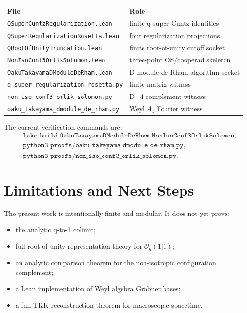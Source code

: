 \documentclass[11pt]{article}
\newcommand{\On}{\mathcal{O}}
\begin{document}
\begin{center}
\begin{tabular}{ll}
\toprule
File & Role\\
\midrule
\texttt{QSuperCuntzRegularization.lean} & finite q-super-Cuntz identities\\
\texttt{QSuperRegularizationRosetta.lean} & four regularization projections\\
\texttt{QRootOfUnityTruncation.lean} & finite root-of-unity cutoff socket\\
\texttt{NonIsoConf3OrlikSolomon.lean} & three-point OS/cooperad skeleton\\
\texttt{OakuTakayamaDModuleDeRham.lean} & D-module de Rham algorithm socket\\
\texttt{q\_super\_regularization\_rosetta.py} & finite matrix witness\\
\texttt{non\_iso\_conf3\_orlik\_solomon.py} & D=4 complement witness\\
\texttt{oaku\_takayama\_dmodule\_de\_rham.py} & Weyl \(A_1\) Fourier witness\\
\bottomrule
\end{tabular}
\end{center}

The current verification commands are:
\[
\begin{aligned}
&\texttt{lake build OakuTakayamaDModuleDeRham NonIsoConf3OrlikSolomon},\\
&\texttt{python3 proofs/oaku\_takayama\_dmodule\_de\_rham.py},\\
&\texttt{python3 proofs/non\_iso\_conf3\_orlik\_solomon.py}.
\end{aligned}
\]

\section{Limitations and Next Steps}

The present work is intentionally finite and modular.  It does not yet prove:
\begin{itemize}[leftmargin=2em]
\item the analytic q-to-1 colimit;
\item full root-of-unity representation theory for \(\On_q(1|1)\);
\item an analytic comparison theorem for the non-isotropic configuration
  complement;
\item a Lean implementation of Weyl algebra Gröbner bases;
\item a full TKK reconstruction theorem for macroscopic spacetime.
\end{itemize}
\end{document}
